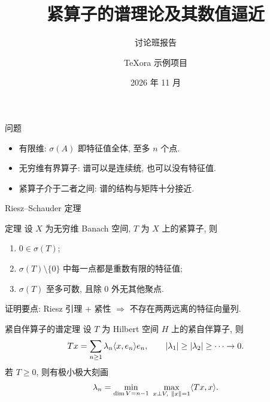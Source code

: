 \documentclass[aspectratio=169]{ctexbeamer}
\title{紧算子的谱理论及其数值逼近}
\subtitle{讨论班报告}
\author{TeXora 示例项目}
\date{2026 年 11 月}
\DeclarePairedDelimiter{\norm}{\lVert}{\rVert}
\DeclarePairedDelimiter{\abs}{\lvert}{\rvert}
\DeclarePairedDelimiter{\inner}{\langle}{\rangle}
\begin{document}
\begin{frame}
  \titlepage
\end{frame}

\begin{frame}{问题}
  \begin{itemize}
    \item 有限维: $\sigma(A)$ 即特征值全体, 至多 $n$ 个点.
    \item 无穷维有界算子: 谱可以是连续统, 也可以没有特征值.
    \item 紧算子介于二者之间: 谱的结构与矩阵十分接近.
  \end{itemize}
  \bigskip
  \centering
\end{frame}

\begin{frame}{Riesz--Schauder 定理}
  \begin{block}{定理}
    设 $X$ 为无穷维 Banach 空间, $T$ 为 $X$ 上的紧算子, 则
    \begin{enumerate}
      \item $0\in\sigma(T)$;
      \item $\sigma(T)\setminus\{0\}$ 中每一点都是重数有限的特征值;
      \item $\sigma(T)$ 至多可数, 且除 $0$ 外无其他聚点.
    \end{enumerate}
  \end{block}
  \pause
  证明要点: Riesz 引理 + 紧性 $\Rightarrow$ 不存在两两远离的特征向量列.
\end{frame}

\begin{frame}{紧自伴算子的谱定理}
  设 $T$ 为 Hilbert 空间 $H$ 上的紧自伴算子, 则
  \begin{equation*}
    Tx=\sum_{n\ge1}\lambda_n\inner{x,e_n}e_n,\qquad \abs{\lambda_1}\ge\abs{\lambda_2}\ge\cdots\to0 .
  \end{equation*}
  \pause
  若 $T\ge0$, 则有极小极大刻画
  \begin{equation*}
    \lambda_n=\min_{\dim V=n-1}\ \max_{x\perp V,\ \norm{x}=1}\inner{Tx,x}.
  \end{equation*}
\end{frame}
\end{document}

